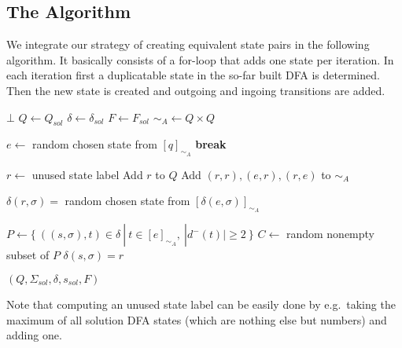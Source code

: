 \subsection{The Algorithm}

We integrate our strategy of creating equivalent state pairs in the following algorithm. It basically consists of a for-loop that adds one state per iteration. In each iteration first a duplicatable state in the so-far built DFA is determined. Then the new state is created and outgoing and ingoing transitions are added.

\vspace{0.2cm}
\begin{spacing}{1}
\begin{algorithmic}[1]
		\State \Return $\bot$
	\EndIf
    \State $Q \gets Q_{sol}$
    \State $\delta \gets \delta_{sol}$
    \State $F \gets F_{sol}$
    \State $\sim_A \gets Q\times Q$
	
	\vspace{0.2cm}
	
    
    	\vspace{0.2cm}
    
		 
				\State $e \gets$ random chosen state from $[q]_{\sim_A}$
				\State \textbf{break}
			\EndIf
		\EndFor
		
		\vspace{0.2cm}
		
		\State $r \gets$ unused state label 
        \State Add $r$ to $Q$
		\State Add $(r,r), (e,r), (r,e)$ to $\sim_A$
		
		\vspace{0.2cm}
		
		 
			\State $\delta(r, \sigma) =$ random chosen state from $[\delta(e, \sigma)]_{\sim_A}$
		\EndFor
		
		\vspace{0.2cm}
		
		\State $P \gets \{\ ((s, \sigma), t) \in \delta\ |\ t \in [e]_{\sim_A},\ |d^-(t)| \geq 2\ \}$ 
		\State $C \gets$ random nonempty subset of $P$
            \State $\delta(s, \sigma) = r$
		\EndFor
		
		\vspace{0.2cm}
		
	\EndFor
    \State \Return $(Q, \Sigma_{sol}, \delta, s_{sol}, F)$
	\EndFunction
\end{algorithmic}
\end{spacing}
\vspace{0.2cm}
\noindent Note that computing an unused state label can be easily done by e.g.\ taking the maximum of all solution DFA states (which are nothing else but numbers) and adding one.

